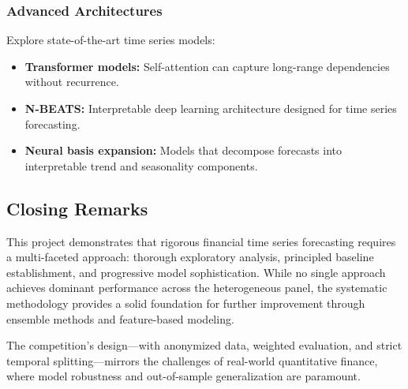 \subsubsection{Advanced Architectures}
Explore state-of-the-art time series models:
\begin{itemize}
    \item \textbf{Transformer models:} Self-attention can capture long-range dependencies without recurrence.
    \item \textbf{N-BEATS:} Interpretable deep learning architecture designed for time series forecasting.
    \item \textbf{Neural basis expansion:} Models that decompose forecasts into interpretable trend and seasonality components.
\end{itemize}

\subsection{Closing Remarks}

This project demonstrates that rigorous financial time series forecasting requires a multi-faceted approach: thorough exploratory analysis, principled baseline establishment, and progressive model sophistication. While no single approach achieves dominant performance across the heterogeneous panel, the systematic methodology provides a solid foundation for further improvement through ensemble methods and feature-based modeling.

The competition's design---with anonymized data, weighted evaluation, and strict temporal splitting---mirrors the challenges of real-world quantitative finance, where model robustness and out-of-sample generalization are paramount.

